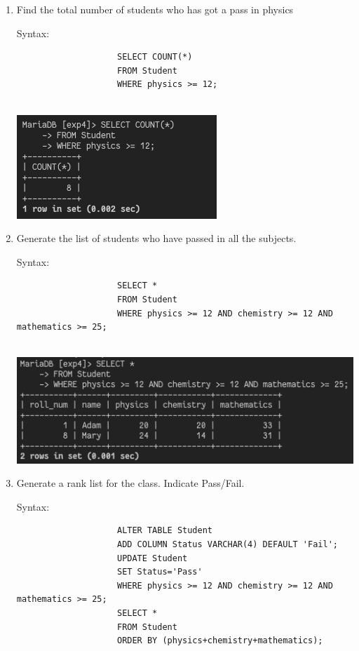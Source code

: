 \documentclass[13pt,oneside]{book}
\begin{document}
\begin{enumerate}
					
					\item
					Find the total number of students who has got a pass in physics
					 
					Syntax:
					\begin{verbatim}
					SELECT COUNT(*)
					FROM Student
					WHERE physics >= 12;
					
					\end{verbatim}
					\includegraphics[]{img/p4/ss5.png}
					
					
					\item
					Generate the list of students who have passed in all the subjects. 
					 
					Syntax:
					\begin{verbatim}
					SELECT *
					FROM Student
					WHERE physics >= 12 AND chemistry >= 12 AND mathematics >= 25;
					
					\end{verbatim}
					\includegraphics[]{img/p4/ss6.png}
					
					
					\item
					Generate a rank list for the class. Indicate Pass/Fail. 
					 
					Syntax:
					\begin{verbatim}
					ALTER TABLE Student
					ADD COLUMN Status VARCHAR(4) DEFAULT 'Fail';
					UPDATE Student
					SET Status='Pass'
					WHERE physics >= 12 AND chemistry >= 12 AND mathematics >= 25;
					SELECT *
					FROM Student
					ORDER BY (physics+chemistry+mathematics);
					

\end{verbatim}
\end{enumerate}
\end{document}
